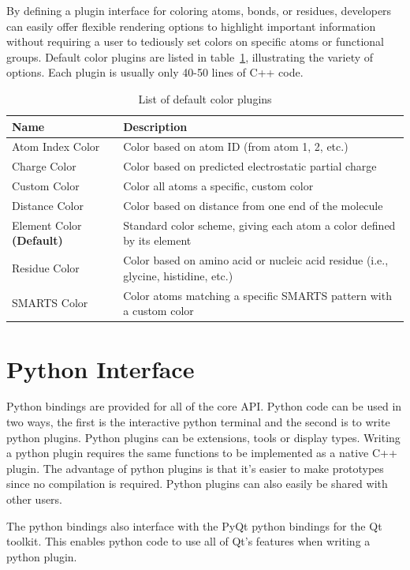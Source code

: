 \documentclass[10pt]{bmc_article}
\newenvironment{bmcformat}{\begin{raggedright}
\baselineskip20pt\sloppy\setboolean{publ}{false}}{\end{raggedright}
\baselineskip20pt\sloppy}
\begin{document}
\begin{bmcformat}
By defining a plugin interface for coloring atoms, bonds, or residues,
developers can easily offer flexible rendering options to highlight
important information without requiring a user to tediously set colors
on specific atoms or functional groups. Default color plugins are
listed in table~\ref{color-table}, illustrating the variety of
options. Each plugin is usually only 40-50 lines of C++ code.

\begin{table}
  \caption{List of default color plugins}
  \label{color-table}
\begin{tabular}{l | l}
\hline
Name & Description \\
\hline
Atom Index Color & Color based on atom ID (from atom 1, 2, etc.) \\
Charge Color & Color based on predicted electrostatic partial charge \\
Custom Color & Color all atoms a specific, custom color \\
Distance Color & Color based on distance from one end of the
molecule \\
Element Color \textbf{(Default)} & Standard color scheme, giving each
atom a color defined by its element\\
Residue Color & Color based on amino acid or nucleic acid residue (i.e., glycine,
histidine, etc.) \\
SMARTS Color & Color atoms matching a specific SMARTS pattern with a
custom color \\
\hline
\end{tabular}
\end{table}

\section{Python Interface} %

Python bindings are provided for all of the core API. Python code can be used
in two ways, the first is the interactive python terminal and the second is to
write python plugins. Python plugins can be extensions, tools or display types.
Writing a python plugin requires the same functions to be implemented as a
native C++ plugin. The advantage of python plugins is that it's easier to make
prototypes since no compilation is required. Python plugins can also easily be
shared with other users.

The python bindings also interface with the PyQt python bindings for the Qt
toolkit. This enables python code to use all of Qt's features when writing a
python plugin.


\end{bmcformat}
\end{document}
